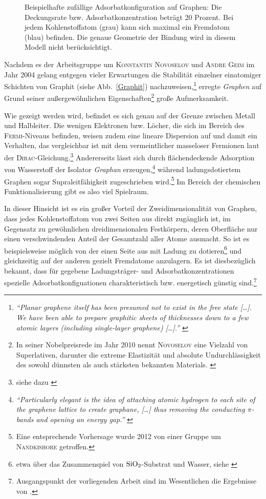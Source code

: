 \documentclass[a4paper, 10pt, twoside, openany]{book} %
\begin{document}
\begin{figure}[t]
\begin{minipage}[b]{0.5\textwidth}
			\caption[Beispielhafte zufällige Adsorbatkonfiguration auf Graphen]{Beispielhafte zufällige Adsorbatkonfiguration auf Graphen: Die Deckungsrate bzw. Adsorbatkonzentration beträgt 20 Prozent. Bei jedem Kohlenstoffatom (grau) kann sich maximal ein Fremdatom (blau) befinden. Die genaue Geometrie der Bindung wird in diesem Modell nicht berücksichtigt.}
			\label{random20}
		\end{minipage}
	\end{figure}
	Nachdem es der Arbeitsgruppe um \textsc{Konstantin Novoselov} und \textsc{Andre Geim} im Jahr 2004 gelang entgegen vieler Erwartungen die Stabilität einzelner einatomiger Schichten von Graphit (siehe Abb.~\ref{Graphit}) nachzuweisen,\footnote{\emph{"`Planar graphene itself has been presumed not to exist in the free state \emph{[\dots]}. We have been able to prepare graphitic sheets of thicknesses down to a few atomic layers (including single-layer graphene) \emph{[\dots]}."'} \cite[S.~666f]{Novoselov1}} erregte \emph{Graphen} auf Grund seiner außergewöhnlichen Eigenschaften\footnote{In seiner Nobelpreisrede im Jahr 2010 nennt \textsc{Novoselov} eine Vielzahl von Superlativen, darunter die extreme Elastizität und absolute Undurchlässigkeit des sowohl dünnsten als auch stärksten bekannten Materials. \cite[S.~107]{Novoselov2}} große Aufmerksamkeit.
	
	Wie gezeigt werden wird, befindet es sich genau auf der Grenze zwischen Metall und Halbleiter. Die wenigen Elektronen bzw. Löcher, die sich im Bereich des \textsc{Fermi}-Niveaus befinden, weisen zudem eine lineare Dispersion auf und damit ein Verhalten, das vergleichbar ist mit dem vermeintlicher masseloser Fermionen laut der \textsc{Dirac}-Gleichung.\footnote{siehe dazu \cite[Abschnitt III]{Katsnelson2}} Andererseits lässt sich durch flächendeckende Adsorption von Wasserstoff der Isolator \emph{Graphan} erzeugen,\footnote{\emph{"`Particularly elegant is the idea of attaching atomic hydrogen to each site of the graphene lattice to create graphane, \emph{[\dots]} thus removing the conducting $\pi$-bands and opening an energy gap."'} \cite[S.~610]{Elias}} während ladungsdotiertem Graphen sogar Supraleitfähigkeit zugeschrieben wird.\footnote{Eine entsprechende Vorhersage wurde 2012 von einer Gruppe um \textsc{Nandkishore} \cite{Nandkishore} getroffen.} Im Bereich der chemischen Funktionalisierung gibt es also viel Spielraum.
	
	In dieser Hinsicht ist es ein großer Vorteil der Zweidimensionalität von Graphen, dass jedes Kohlenstoffatom von zwei Seiten aus direkt zugänglich ist, im Gegensatz zu gewöhnlichen dreidimensionalen Festkörpern, deren Oberfläche nur einen verschwindenden Anteil der Gesamtzahl aller Atome ausmacht. So ist es beispielsweise möglich von der einen Seite aus mit Ladung zu dotieren\footnote{etwa über das Zusammenspiel von $\rm SiO_2$-Substrat und Wasser, siehe \cite{Wehling1}} und gleichzeitig auf der anderen gezielt Fremdatome anzulagern. Es ist diesbezüglich bekannt, dass für gegebene Ladungsträger- und Adsorbatkonzentrationen spezielle Adsorbatkonfiguationen charakteristisch bzw. energetisch günstig sind.\footnote{Ausgangspunkt der vorliegenden Arbeit sind im Wesentlichen die Ergebnisse von \cite{Wehling2}.}
	
\end{document}

